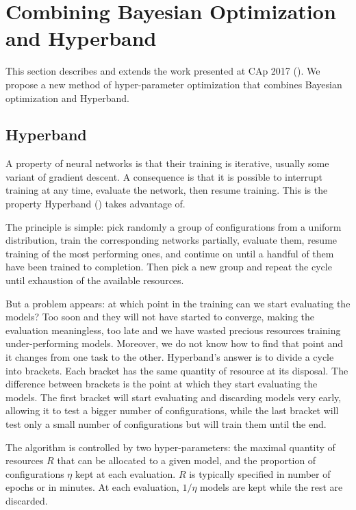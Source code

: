 \section{Combining Bayesian Optimization and Hyperband}
\label{sec:cap}

This section describes and extends the work presented at CAp 2017 (\textcite{bertrand2017CAp}). We propose a new method of hyper-parameter optimization that combines Bayesian optimization and Hyperband.

\subsection{Hyperband}
\label{ssec:hyperband}

A property of neural networks is that their training is iterative, usually some variant of gradient descent. A consequence is that it is possible to interrupt training at any time, evaluate the network, then resume training. This is the property Hyperband (\textcite{li2017ICLR}) takes advantage of.

The principle is simple: pick randomly a group of configurations from a uniform distribution, train the corresponding networks partially, evaluate them, resume training of the most performing ones, and continue on until a handful of them have been trained to completion. Then pick a new group and repeat the cycle until exhaustion of the available resources.

But a problem appears: at which point in the training can we start evaluating the models? Too soon and they will not have started to converge, making the evaluation meaningless, too late and we have wasted precious resources training under-performing models. Moreover, we do not know how to find that point and it changes from one task to the other. Hyperband's answer is to divide a cycle into brackets. Each bracket has the same quantity of resource at its disposal. The difference between brackets is the point at which they start evaluating the models. The first bracket will start evaluating and discarding models very early, allowing it to test a bigger number of configurations, while the last bracket will test only a small number of configurations but will train them until the end.

The algorithm is controlled by two hyper-parameters: the maximal quantity of resources $R$ that can be allocated to a given model, and the proportion of configurations $\eta$ kept at each evaluation. $R$ is typically specified in number of epochs or in minutes. At each evaluation, $1 / \eta$ models are kept while the rest are discarded. 

